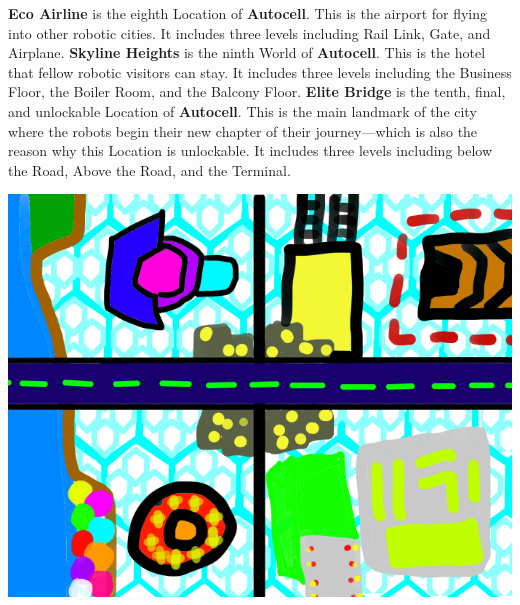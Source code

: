 \documentclass[12pt]{article}
\begin{document}
\begin{CJK}{UTF8}{min}
	\textbf{Eco Airline} is the eighth Location of \textbf{Autocell}. This is the airport for flying into other robotic cities. It includes three levels including Rail Link, Gate, and Airplane. \newline \newline
	\textbf{Skyline Heights} is the ninth World of \textbf{Autocell}. This is the hotel that fellow robotic visitors can stay. It includes three levels including the Business Floor, the Boiler Room, and the Balcony Floor. \newline \newline
	\textbf{Elite Bridge} is the tenth, final, and unlockable Location of \textbf{Autocell}. This is the main landmark of the city where the robots begin their new chapter of their journey---which is also the reason why this Location is unlockable. It includes three levels including below the Road, Above the Road, and the Terminal. \newline \newline
	\newpage
	\begin{center}
		\includegraphics[width=7.5in]{Map}
	\end{center}
	\newpage

\end{CJK}
\end{document}
